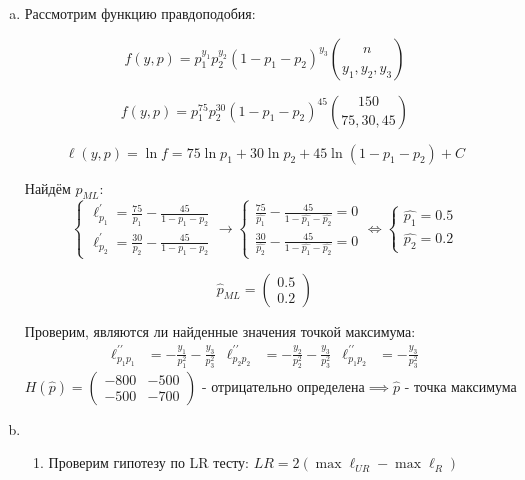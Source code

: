 \documentclass[12pt,letterpaper]{article}
\begin{document}
\begin{enumerate} [a)]
    \item 
    {
        Рассмотрим функцию правдоподобия:

        $$f(y,p) = p_1^{y_1}p_2^{y_2}(1-p_1-p_2)^{y_3} \binom{n}{y_1,y_2,y_3}$$

        $$f(y,p) = p_1^{75}p_2^{30}(1-p_1-p_2)^{45} \binom{150}{75,30,45}$$

        $$\ell(y,p) = \ln f = 75\ln p_1 + 30\ln p_2 + 45\ln (1-p_1-p_2) + C$$

        Найдём $p_{ML}$:
        $$
        \begin{cases}
            \ell^{\prime}_{p_1} = \frac{75}{p_1} - \frac{45}{1-p_1-p_2} \\
            \ell^{\prime}_{p_2} = \frac{30}{p_2} - \frac{45}{1-p_1-p_2}
        \end{cases}
        \longrightarrow
        \begin{cases}
            \frac{75}{\hat{p_1}} - \frac{45}{1-\hat{p_1}-\hat{p_2}} = 0 \\
            \frac{30}{\hat{p_2}} - \frac{45}{1-\hat{p_1}-\hat{p_2}} = 0
        \end{cases} \iff 
        \begin{cases} 
            \hat{p_1} = 0.5 \\ \hat{p_2} = 0.2 
        \end{cases}$$
    
        $$\hat{p}_{ML} = \begin{pmatrix} 0.5 \\ 0.2 \end{pmatrix}$$
        
        Проверим, являются ли найденные значения точкой максимума:
        \begin{align*}
            \ell^{\prime\prime}_{p_1 p_1} &= -\frac{y_1}{p_1^2} - \frac{y_3}{p_3^2} & \ell^{\prime\prime}_{p_2 p_2} &= -\frac{y_2}{p_2^2} - \frac{y_3}{p_3^2} & \ell^{\prime\prime}_{p_1 p_2} &= - \frac{y_3}{p_3^2}
        \end{align*}
        $$ H(\hat{p}) = 
        \begin{pmatrix}
            -800 & -500 \\
            -500 & -700
        \end{pmatrix}
        \text{ - отрицательно определена} \implies \hat{p} \text{ - точка максимума}
        $$
    }    
    \item
    {
        \begin{enumerate} [1.]
            \item 
            {
                Проверим гипотезу по LR тесту: $LR = 2(\max \ell_{UR} - \max \ell_{R})$\\

}
\end{enumerate}}
\end{enumerate}
\end{document}

